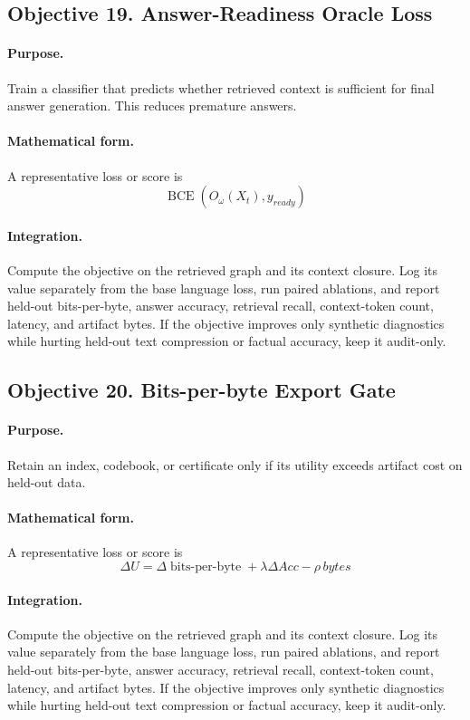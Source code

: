 \documentclass[11pt]{article}
\theoremstyle{definition}
\theoremstyle{remark}
\newcommand{\bits}{\ensuremath{\operatorname{bits\text{-}per\text{-}byte}}}
\begin{document}
\subsection{Objective 19. Answer-Readiness Oracle Loss}
\paragraph{Purpose.} Train a classifier that predicts whether retrieved context is sufficient for final answer generation. This reduces premature answers.

\paragraph{Mathematical form.} A representative loss or score is
\[
    \operatorname{BCE}(O_\omega(X_t),y_{ready})
\]

\paragraph{Integration.} Compute the objective on the retrieved graph and its context closure. Log its value separately from the base language loss, run paired ablations, and report held-out bits-per-byte, answer accuracy, retrieval recall, context-token count, latency, and artifact bytes. If the objective improves only synthetic diagnostics while hurting held-out text compression or factual accuracy, keep it audit-only.


\subsection{Objective 20. Bits-per-byte Export Gate}
\paragraph{Purpose.} Retain an index, codebook, or certificate only if its utility exceeds artifact cost on held-out data.

\paragraph{Mathematical form.} A representative loss or score is
\[
    \Delta U=\Delta \bits+\lambda\Delta Acc-\rho\,bytes
\]

\paragraph{Integration.} Compute the objective on the retrieved graph and its context closure. Log its value separately from the base language loss, run paired ablations, and report held-out bits-per-byte, answer accuracy, retrieval recall, context-token count, latency, and artifact bytes. If the objective improves only synthetic diagnostics while hurting held-out text compression or factual accuracy, keep it audit-only.
\end{document}
